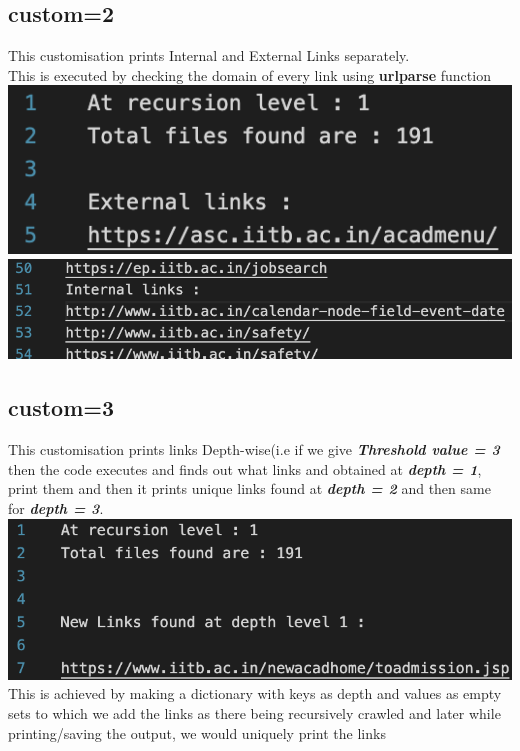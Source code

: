 \documentclass{article}
\begin{document}
\subsection{custom=2}
This customisation prints Internal and External Links separately.\\
This is executed by checking the domain of every link using \textbf{urlparse} function\\[1cm]
\includegraphics[width=14cm]{external.png}\\[1cm]
\includegraphics[width=14cm]{internal.png}
\subsection{custom=3}
    This customisation prints links Depth-wise(i.e if we give \textit{\textbf{Threshold value = 3}} then the code executes and finds out what links and obtained at \textit{\textbf{depth = 1}}, print them and then it prints unique links found at \textit{\textbf{depth = 2}} and then same for \textit{\textbf{depth = 3}}.\\[1cm]
    \includegraphics[width=14cm]{depth.png}\\[0.3cm]
    This is achieved by making a dictionary with keys as depth and values as empty sets to which we add the links as there being recursively crawled and later while printing/saving the output, we would uniquely print the links
\end{document}

